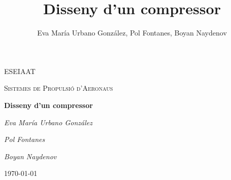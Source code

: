 \documentclass[12pt,a4paper]{article}
\author{Eva María Urbano González, Pol Fontanes, Boyan Naydenov}
\title{Disseny d'un compressor}
\begin{document}
\begin{titlepage}
	\centering
	\vspace{4.5cm}
	{\scshape ESEIAAT \par}
	{\scshape\Large Sistemes de Propulsió d'Aeronaus \par}
	\vspace{1.5cm}
	{\huge\bfseries Disseny d'un compressor \par}
	\vspace{15cm}
	{\Large\itshape Eva María Urbano González\par}
	{\Large\itshape Pol Fontanes\par}
	{\Large\itshape Boyan Naydenov\par}
	\vfill
	\vspace{1cm}
	\today
\end{titlepage}
\tableofcontents
\lstlistoflistings
\listoffigures
\pagebreak





\newpage


\newpage


\end{document}
